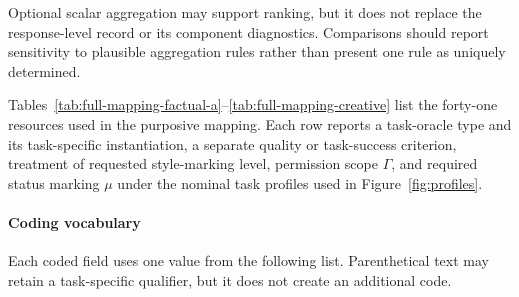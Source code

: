 \documentclass{clv2025}
\begin{document}
Optional scalar aggregation may support ranking, but it does not replace the
response-level record or its component diagnostics. Comparisons should report
sensitivity to plausible aggregation rules rather than present one rule as
uniquely determined.

%
\makeatletter\def\@currentlabel{B}\makeatother\label{app:mapping}
\renewcommand*{\theHtable}{B.\arabic{table}}

Tables~\ref{tab:full-mapping-factual-a}--\ref{tab:full-mapping-creative} list the forty-one resources used in the purposive mapping.
Each row reports a task-oracle type and its task-specific instantiation, a
separate quality or task-success criterion, treatment of requested
style-marking level, permission scope $\Gamma$, and required status marking
$\mu$ under the nominal task profiles used in Figure~\ref{fig:profiles}.

\paragraph{Coding vocabulary}
Each coded field uses one value from the following list. Parenthetical text may
retain a task-specific qualifier, but it does not create an additional code.
\end{document}
